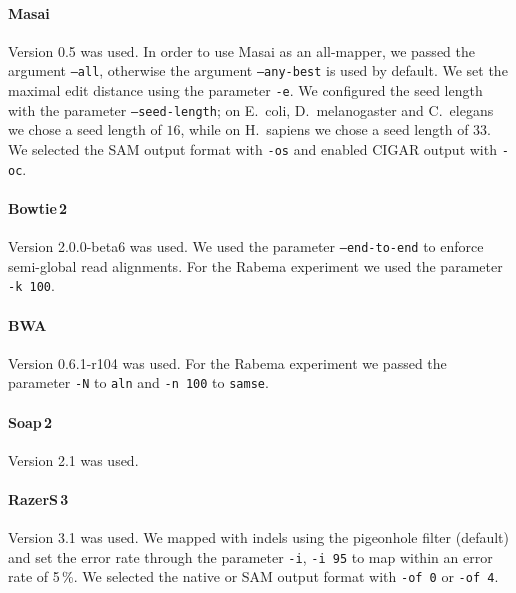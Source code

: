 \paragraph{Masai}
Version 0.5 was used.
In order to use Masai as an all-mapper, we passed the argument \texttt{--all}, otherwise the argument \texttt{--any-best} is used by default.
We set the maximal edit distance using the parameter \texttt{-e}.
We configured the seed length with the parameter \texttt{--seed-length}; on E.~coli, D.~melanogaster and C.~elegans we chose a seed length of $16$, while on H.~sapiens we chose a seed length of $33$.
We selected the SAM output format with \texttt{-os} and enabled CIGAR output with \texttt{-oc}.

\paragraph{Bowtie\,2}
Version 2.0.0-beta6 was used.
We used the parameter \texttt{--end-to-end} to enforce semi-global read alignments.
For the Rabema experiment we used the parameter \texttt{-k 100}.

\paragraph{BWA}
Version 0.6.1-r104 was used.
For the Rabema experiment we passed the parameter \texttt{-N} to \texttt{aln} and \texttt{-n 100} to \texttt{samse}.

\paragraph{Soap\,2}
Version 2.1 was used.

\paragraph{RazerS\,3}
Version 3.1 was used.
We mapped with indels using the pigeonhole filter (default) and set the error rate through the parameter \texttt{-i}, \eg \texttt{-i 95} to map within an error rate of 5\,\%.
We selected the native or SAM output format with \texttt{-of 0} or \texttt{-of 4}.

